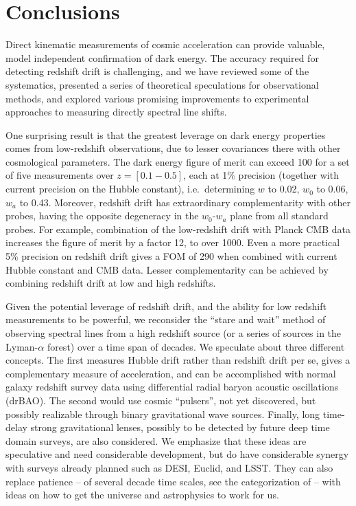 \documentclass[preprint2, 10pt]{aastex}
\begin{document}
\section{Conclusions} \label{sec:concl} 

Direct kinematic measurements of cosmic acceleration can provide valuable, 
model independent confirmation of dark energy. The accuracy required for 
detecting redshift drift is challenging, and we have reviewed some of the 
systematics, presented a series of theoretical speculations for observational 
methods, and explored various promising improvements to experimental 
approaches to measuring directly spectral line shifts.  

One surprising result is that the greatest leverage on dark energy properties 
comes from low-redshift observations, due to lesser covariances there with 
other cosmological parameters. The dark energy figure of merit can exceed 
100 for a set of five measurements over $z=[0.1-0.5]$, each at 1\% precision 
(together with current precision on the Hubble constant), i.e.\ determining 
$w$ to 0.02, $w_0$ to 0.06, $w_a$ to 0.43. Moreover, redshift drift 
has extraordinary complementarity with other probes, having the opposite 
degeneracy in the $w_0$-$w_a$ plane from all standard probes. For example, 
combination of the low-redshift drift with Planck CMB data increases 
the figure of merit by a factor 12, to over 1000. Even a more practical 
5\% precision on redshift drift gives a FOM of 290 when combined with 
current Hubble constant and CMB data. Lesser complementarity can be achieved 
by combining redshift drift at low and high redshifts. 

Given the potential leverage of redshift drift, and the ability for low 
redshift measurements to be powerful, we reconsider the ``stare and wait'' 
method of observing spectral lines from a high redshift source (or a 
series of sources in the Lyman-$\alpha$ forest) over a time span of decades. 
We speculate about three different concepts. The first measures Hubble drift 
rather than redshift drift per se, gives a complementary measure of 
acceleration, and can be accomplished with normal galaxy redshift survey 
data using differential radial baryon acoustic oscillations (drBAO). 
The second would use cosmic ``pulsers'', not yet discovered, but possibly 
realizable through binary gravitational wave sources. Finally, long time-delay
strong gravitational lenses, possibly to be detected by future deep 
time domain surveys, are also considered. We emphasize that these ideas 
are speculative and need considerable development, but do have considerable 
synergy with surveys already planned such as DESI, Euclid, and LSST.  They 
can also replace patience -- of several decade time scales, see the 
categorization of \citet{stebbins} -- with ideas on how to get the universe 
and astrophysics to work for us. 
\end{document}
